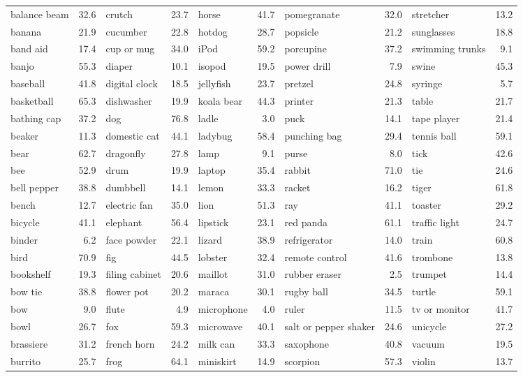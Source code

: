\begin{table}[t]
{\begin{tabular}{@{}lr|lr|lr|lr|lr@{}}
balance beam & 32.6 & crutch & 23.7 & horse & 41.7 & pomegranate & 32.0 & stretcher & 13.2 \\
banana & 21.9 & cucumber & 22.8 & hotdog & 28.7 & popsicle & 21.2 & sunglasses & 18.8 \\
band aid & 17.4 & cup or mug & 34.0 & iPod & 59.2 & porcupine & 37.2 & swimming trunks & 9.1 \\
banjo & 55.3 & diaper & 10.1 & isopod & 19.5 & power drill & 7.9 & swine & 45.3 \\
baseball & 41.8 & digital clock & 18.5 & jellyfish & 23.7 & pretzel & 24.8 & syringe & 5.7 \\
basketball & 65.3 & dishwasher & 19.9 & koala bear & 44.3 & printer & 21.3 & table & 21.7 \\
bathing cap & 37.2 & dog & 76.8 & ladle & 3.0 & puck & 14.1 & tape player & 21.4 \\
beaker & 11.3 & domestic cat & 44.1 & ladybug & 58.4 & punching bag & 29.4 & tennis ball & 59.1 \\
bear & 62.7 & dragonfly & 27.8 & lamp & 9.1 & purse & 8.0 & tick & 42.6 \\
bee & 52.9 & drum & 19.9 & laptop & 35.4 & rabbit & 71.0 & tie & 24.6 \\
bell pepper & 38.8 & dumbbell & 14.1 & lemon & 33.3 & racket & 16.2 & tiger & 61.8 \\
bench & 12.7 & electric fan & 35.0 & lion & 51.3 & ray & 41.1 & toaster & 29.2 \\
bicycle & 41.1 & elephant & 56.4 & lipstick & 23.1 & red panda & 61.1 & traffic light & 24.7 \\
binder & 6.2 & face powder & 22.1 & lizard & 38.9 & refrigerator & 14.0 & train & 60.8 \\
bird & 70.9 & fig & 44.5 & lobster & 32.4 & remote control & 41.6 & trombone & 13.8 \\
bookshelf & 19.3 & filing cabinet & 20.6 & maillot & 31.0 & rubber eraser & 2.5 & trumpet & 14.4 \\
bow tie & 38.8 & flower pot & 20.2 & maraca & 30.1 & rugby ball & 34.5 & turtle & 59.1 \\
bow & 9.0 & flute & 4.9 & microphone & 4.0 & ruler & 11.5 & tv or monitor & 41.7 \\
bowl & 26.7 & fox & 59.3 & microwave & 40.1 & salt or pepper shaker & 24.6 & unicycle & 27.2 \\
brassiere & 31.2 & french horn & 24.2 & milk can & 33.3 & saxophone & 40.8 & vacuum & 19.5 \\
burrito & 25.7 & frog & 64.1 & miniskirt & 14.9 & scorpion & 57.3 & violin & 13.7 \\

\end{tabular}}
\end{table}
